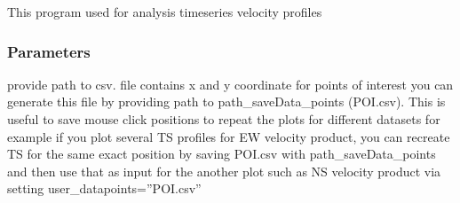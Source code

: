 \documentclass[letterpaper,10pt]{sphinxmanual}
\begin{document}
\begin{fulllineitems}
\label{\detokenize{generated/akhdefo_functions.akhdefo_ts_plot:akhdefo_functions.akhdefo_ts_plot}}
\pysigstartsignatures
{}
\pysigstopsignatures
\sphinxAtStartPar
This program used for analysis time\sphinxhyphen{}series velocity profiles


\subsubsection{Parameters}
\label{\detokenize{generated/akhdefo_functions.akhdefo_ts_plot:parameters}}\begin{description}
\sphinxAtStartPar
provide path to csv. file contains x and y coordinate for points of interest
you can generate this file by providing path to path\_saveData\_points (POI.csv).
This is useful to save mouse click positions to repeat the plots for different datasets for example if you plot several TS profiles for
EW velocity product, you can recreate TS for the same exact position by saving POI.csv with path\_saveData\_points and then use that as input for the another
plot such as NS velocity product via setting user\_datapoints=”POI.csv”


\end{description}
\end{fulllineitems}
\end{document}
